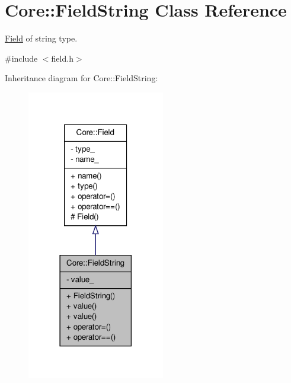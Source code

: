 \hypertarget{classCore_1_1FieldString}{
\section{Core::FieldString Class Reference}
\label{dd/d02/classCore_1_1FieldString}
}


\hyperlink{classCore_1_1Field}{Field} of string type.  




{\ttfamily \#include $<$field.h$>$}



Inheritance diagram for Core::FieldString:
\nopagebreak
\begin{figure}[H]
\begin{center}
\leavevmode
\includegraphics[width=170pt]{d6/d1c/classCore_1_1FieldString__inherit__graph}
\end{center}
\end{figure}



